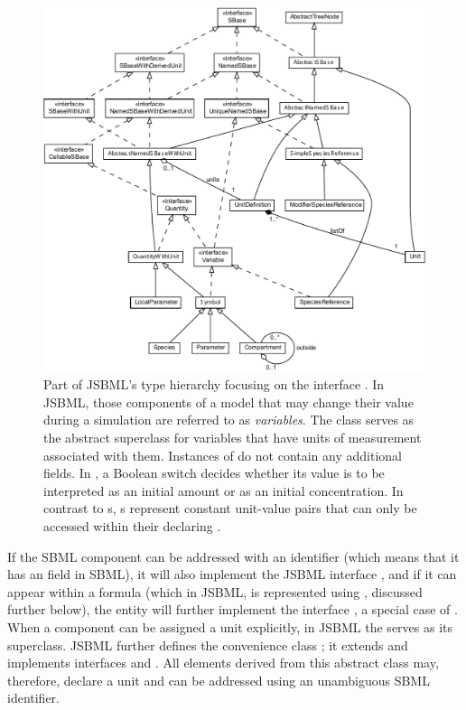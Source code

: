 \begin{figure}[b]
  \vspace*{2ex}
  \centering
  \includegraphics[width=\textwidth]{../common/img/Symbol.pdf}
  \caption[The interface \Variable]{Part of JSBML's type
    hierarchy focusing on the interface \Variable.  In JSBML,
    those components of a model that may change their value during a
    simulation are referred to as \emph{variables}. The class \Symbol serves
    as the abstract superclass for variables that have units of measurement
    associated with them. Instances of \Parameter do not contain any
    additional fields. In \Species, a Boolean switch decides whether its
    value is to be interpreted as an initial amount or as an initial
    concentration. In contrast to \Variable{}s, \LocalParameter{}s represent
    constant unit-value pairs that can only be accessed within their
    declaring \KineticLaw. }
 \label{fig:Variable}
\end{figure}


If the SBML component can be addressed with an identifier (which means that
it has an  field in SBML), it will also implement the JSBML
interface \NamedSBaseWithDerivedUnit, and if it can appear within a formula
(which in JSBML, is represented using \ASTNode, discussed further below),
the entity will further implement the interface \CallableSBase, a special
case of .  When a component can be assigned
a unit explicitly, in JSBML the \SBaseWithUnit serves as its superclass.
JSBML further defines the convenience class \AbstractNamedSBaseWithUnit; it
extends \AbstractNamedSBase and implements interfaces \SBaseWithUnit
and \NamedSBaseWithDerivedUnit.  All elements derived from this abstract
class may, therefore, declare a unit and can be addressed using an
unambiguous SBML identifier.

